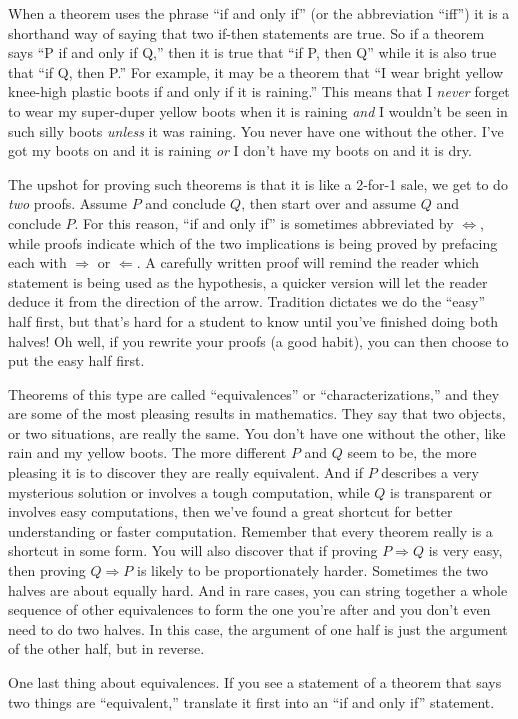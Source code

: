 \begin{para}When a theorem uses the phrase ``if and only if'' (or the abbreviation ``iff'') it is a shorthand way of saying that two if-then statements are true.  So if a theorem says ``P if and only if Q,'' then it is true that ``if P, then Q'' while it is also true that ``if Q, then P.''   For example, it may be a theorem that ``I wear bright yellow knee-high plastic boots if and only if it is raining.''  This means that I {\em never} forget to wear my super-duper yellow boots when it is raining {\em and} I wouldn't be seen in such silly boots {\em unless} it was raining.  You never have one without the other.  I've got my boots on and it is raining {\em or} I don't have my boots on and it is dry.\end{para}
%
\begin{para}The upshot for proving such theorems is that it is like a 2-for-1 sale, we get to do {\em two} proofs.  Assume $P$ and conclude $Q$, then start over and assume $Q$ and conclude $P$.  For this reason, ``if and only if'' is sometimes abbreviated by $\iff$, while proofs indicate which of the two implications is being proved by prefacing each with $\Rightarrow$ or $\Leftarrow$.  A carefully written proof will remind the reader which statement is being used as the hypothesis, a quicker version will let the reader deduce it from the direction of the arrow.  Tradition dictates we do the ``easy'' half first, but that's hard for a student to know until you've finished doing both halves!  Oh well, if you rewrite your proofs (a good habit), you can then choose to put the easy half first.\end{para}
%
\begin{para}Theorems of this type are called ``equivalences'' or ``characterizations,'' and they are some of the most pleasing results in mathematics.  They say that two objects, or two situations, are really the same.  You don't have one without the other, like rain and my yellow boots.  The more different $P$ and $Q$ seem to be, the more pleasing it is to discover they are really equivalent.  And if $P$ describes a very mysterious solution or involves a tough computation, while $Q$ is transparent or involves easy computations, then we've found a great shortcut for better understanding or faster computation.  Remember that every theorem really is a shortcut in some form.  You will also discover that if proving $P\Rightarrow Q$ is very easy, then proving $Q\Rightarrow P$ is likely to be proportionately harder.  Sometimes the two halves are about equally hard.  And in rare cases, you can string together a whole sequence of other equivalences to form the one you're after and you don't even need to do two halves.  In this case, the argument of one half is just the argument of the other half, but in reverse.\end{para}
%
\begin{para}One last thing about equivalences.  If you see a statement of a theorem that says two things are ``equivalent,'' translate it first into an ``if and only if'' statement.\end{para}
